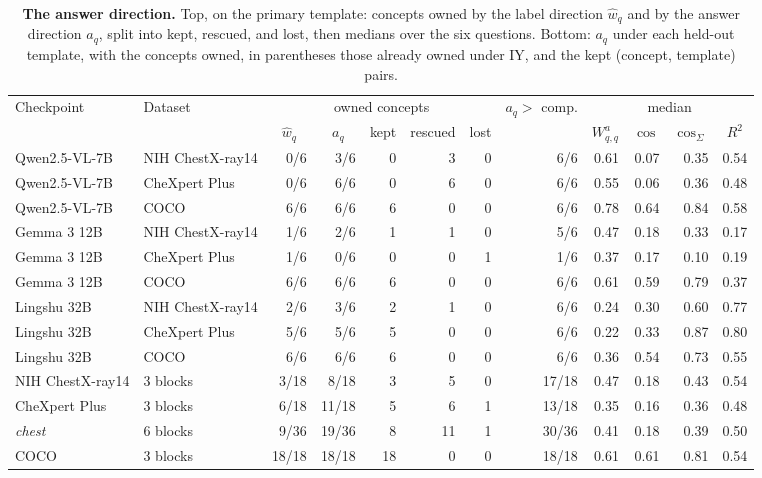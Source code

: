 \begin{table}[h]
\centering
\scriptsize
\setlength{\tabcolsep}{3.5pt}
\caption{\textbf{The answer direction.} Top, on the primary template: concepts owned by the label direction $\hat w_q$ and by the answer direction $a_q$, split into kept, rescued, and lost, then medians over the six questions. Bottom: $a_q$ under each held-out template, with the concepts owned, in parentheses those already owned under IY, and the kept (concept, template) pairs.}
\label{tab:cf-ansdir}
\begin{tabular}{llrrrrrrrrrr}
\toprule
\multirow{2}{*}{Checkpoint} & \multirow{2}{*}{Dataset} & \multicolumn{5}{c}{owned concepts} & \multirow{2}{*}{$a_q>$ comp.} & \multicolumn{4}{c}{median}\\
\cmidrule(lr){3-7}\cmidrule(lr){9-12}
&  & \multicolumn{1}{c}{$\hat w_q$} & \multicolumn{1}{c}{$a_q$} & \multicolumn{1}{c}{kept} & \multicolumn{1}{c}{rescued} & \multicolumn{1}{c}{lost} &  & \multicolumn{1}{c}{$W^a_{q,q}$} & \multicolumn{1}{c}{$\cos$} & \multicolumn{1}{c}{$\cos_\Sigma$} & \multicolumn{1}{c}{$R^2$}\\
\midrule
Qwen2.5-VL-7B & NIH ChestX-ray14 & 0/6 & 3/6 & 0 & 3 & 0 & 6/6 & 0.61 & 0.07 & 0.35 & 0.54 \\
Qwen2.5-VL-7B & CheXpert Plus & 0/6 & 6/6 & 0 & 6 & 0 & 6/6 & 0.55 & 0.06 & 0.36 & 0.48 \\
Qwen2.5-VL-7B & COCO & 6/6 & 6/6 & 6 & 0 & 0 & 6/6 & 0.78 & 0.64 & 0.84 & 0.58 \\
Gemma 3 12B & NIH ChestX-ray14 & 1/6 & 2/6 & 1 & 1 & 0 & 5/6 & 0.47 & 0.18 & 0.33 & 0.17 \\
Gemma 3 12B & CheXpert Plus & 1/6 & 0/6 & 0 & 0 & 1 & 1/6 & 0.37 & 0.17 & 0.10 & 0.19 \\
Gemma 3 12B & COCO & 6/6 & 6/6 & 6 & 0 & 0 & 6/6 & 0.61 & 0.59 & 0.79 & 0.37 \\
Lingshu 32B & NIH ChestX-ray14 & 2/6 & 3/6 & 2 & 1 & 0 & 6/6 & 0.24 & 0.30 & 0.60 & 0.77 \\
Lingshu 32B & CheXpert Plus & 5/6 & 5/6 & 5 & 0 & 0 & 6/6 & 0.22 & 0.33 & 0.87 & 0.80 \\
Lingshu 32B & COCO & 6/6 & 6/6 & 6 & 0 & 0 & 6/6 & 0.36 & 0.54 & 0.73 & 0.55 \\
\midrule
NIH ChestX-ray14 & 3 blocks & 3/18 & 8/18 & 3 & 5 & 0 & 17/18 & 0.47 & 0.18 & 0.43 & 0.54 \\
CheXpert Plus & 3 blocks & 6/18 & 11/18 & 5 & 6 & 1 & 13/18 & 0.35 & 0.16 & 0.36 & 0.48 \\
\textit{chest} & 6 blocks & 9/36 & 19/36 & 8 & 11 & 1 & 30/36 & 0.41 & 0.18 & 0.39 & 0.50 \\
COCO & 3 blocks & 18/18 & 18/18 & 18 & 0 & 0 & 18/18 & 0.61 & 0.61 & 0.81 & 0.54 \\
\bottomrule
\end{tabular}


\end{table}
